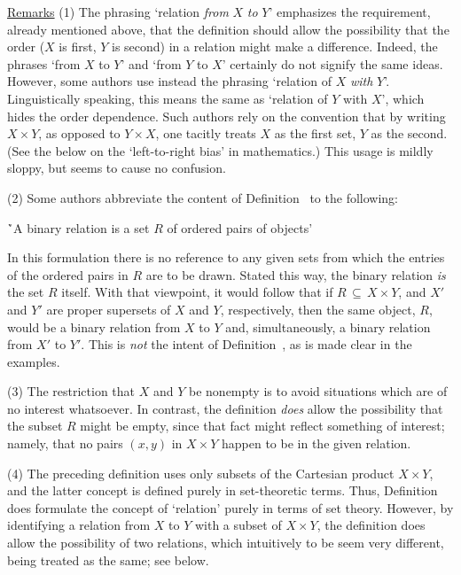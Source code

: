        \underline{Remarks} (1) The phrasing `relation {\em from} $X$ {\em to} $Y$' emphasizes the requirement, already mentioned above,
    that the definition should allow the possibility that the order ($X$ is first, $Y$ is second) in a relation might make a difference.
    Indeed, the phrases `from $X$ to $Y$' and `from $Y$ to $X$' certainly do not signify the same ideas.
    However, some authors use instead the phrasing `relation of $X$ {\em with} $Y$'.
    Linguistically speaking, this means the same as `relation of $Y$ with $X$', which hides the order dependence.
    Such authors rely on the convention that by writing $X{\times}Y$, as opposed to $Y{\times}X$,
    one tacitly treats $X$ as the first set, $Y$ as the second. (See the {\Note} below on the `left-to-right bias' in mathematics.)
    This usage is mildly sloppy, but seems to cause no confusion.

        (2) Some authors abbreviate the content of Definition~ to the following:

\VA

        \h `A binary relation is a set $R$ of ordered pairs of objects'

\VA

\noindent In this formulation there is no reference to any given sets from which the entries of the ordered pairs in $R$ are to be drawn.
    Stated this way, the binary relation {\em is} the set $R$ itself. With that viewpoint, it would follow that if $R \,{\subseteq}\, X{\times}Y$,
    and $X'$ and $Y'$ are proper supersets of $X$ and $Y$, respectively, then the same object, $R$,
    would be a binary relation from $X$ to $Y$ and, simultaneously, a binary relation from $X'$ to $Y'$.
    This is {\em not} the intent of Definition~, as is made clear in the examples.
    

        (3) The restriction that $X$ and $Y$ be nonempty is to avoid situations which are of no interest whatsoever.
    In contrast, the definition {\em does} allow the possibility that the subset $R$ might be empty, since that fact might reflect something of interest;
    namely, that no pairs $(x,y)$ in $X{\times}Y$ happen to be in the given relation.

        (4) The preceding definition uses only subsets of the Cartesian product $X{\times}Y$, and the latter concept is defined purely in set-theoretic terms.
    Thus, Definition~ does formulate the concept of `relation' purely in terms of set theory.
    However, by identifying a relation from $X$ to $Y$ with a subset of $X{\times}Y$,
    the definition does allow the possibility of two relations, which intuitively to be seem very different, being treated as the same; see below.


